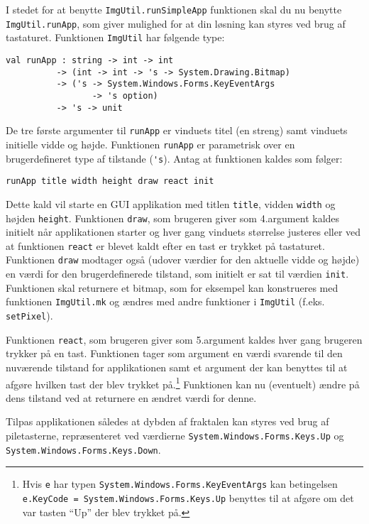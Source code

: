 \label{sierpinskikeys.ov} I stedet for at benytte
  \lstinline{ImgUtil.runSimpleApp} funktionen skal du nu benytte
  \lstinline{ImgUtil.runApp}, som giver mulighed for at din løsning
  kan styres ved brug af tastaturet. Funktionen \lstinline{ImgUtil}
  har følgende type:
\begin{footnotesize}
\begin{lstlisting}[numbers=none,frame=none,mathescape]
val runApp : string -> int -> int
          -> (int -> int -> 's -> System.Drawing.Bitmap)
          -> ('s -> System.Windows.Forms.KeyEventArgs
                 -> 's option)
          -> 's -> unit
\end{lstlisting}
\end{footnotesize}
De tre første argumenter til \lstinline{runApp} er vinduets titel (en
streng) samt vinduets initielle vidde og højde. Funktionen
\lstinline{runApp} er parametrisk over en brugerdefineret type af tilstande (\lstinline{'s}). Antag at funktionen kaldes som følger:
\begin{footnotesize}
\begin{lstlisting}[numbers=none,frame=none,mathescape]
  runApp title width height draw react init
\end{lstlisting}
\end{footnotesize}
Dette kald vil starte en GUI applikation med titlen \lstinline{title},
vidden \lstinline{width} og højden \lstinline{height}. Funktionen
\lstinline{draw}, som brugeren giver som 4.\@ argument kaldes initielt
når applikationen starter og hver gang vinduets størrelse justeres
eller ved at funktionen \lstinline{react} er blevet kaldt efter en
tast er trykket på tastaturet. Funktionen \lstinline{draw} modtager
også (udover værdier for den aktuelle vidde og højde) en værdi for den
brugerdefinerede tilstand, som initielt er sat til værdien
\lstinline{init}. Funktionen skal returnere et bitmap, som for
eksempel kan konstrueres med funktionen \lstinline{ImgUtil.mk} og
ændres med andre funktioner i \lstinline{ImgUtil}
(f.eks. \lstinline{setPixel}).

Funktionen \lstinline{react}, som brugeren giver som 5.\@ argument
kaldes hver gang brugeren trykker på en tast. Funktionen tager som
argument en værdi svarende til den nuværende tilstand for
applikationen samt et argument der kan benyttes til at afgøre hvilken
tast der blev trykket på.\footnote{Hvis \lstinline{e} har typen
  \lstinline{System.Windows.Forms.KeyEventArgs} kan betingelsen
  \lstinline{e.KeyCode = System.Windows.Forms.Keys.Up} benyttes til at
  afgøre om det var tasten ``Up'' der blev trykket på.} Funktionen kan
nu (eventuelt) ændre på dens tilstand ved at returnere en ændret værdi
for denne.

Tilpas applikationen således at dybden af
fraktalen kan styres ved brug af piletasterne, repræsenteret ved værdierne
\lstinline{System.Windows.Forms.Keys.Up} og
\lstinline{System.Windows.Forms.Keys.Down}.
